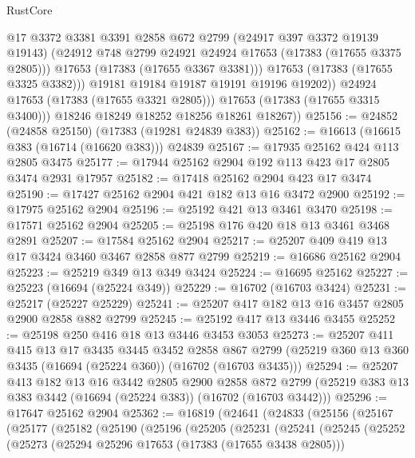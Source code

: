 \begin{lexlean}{RustCore}
\begin{coremodule}
                    @17
                    @3372
                    @3381
                    @3391
                    @2858
                    @672
                    @2799
                    (@24917 @397 @3372 @19139 @19143)
                    (@24912 @748 @2799 @24921 @24924 @17653 (@17383 (@17655 @3375 @2805)))
                    @17653
                    (@17383 (@17655 @3367 @3381)))
                  @17653
                  (@17383 (@17655 @3325 @3382)))
                @19181
                @19184
                @19187
                @19191
                @19196
                @19202))
            @24924
            @17653
            (@17383 (@17655 @3321 @2805)))
          @17653
          (@17383 (@17655 @3315 @3400)))
        @18246
        @18249
        @18252
        @18256
        @18261
        @18267))
@25156 := @24852 (@24858 @25150) (@17383 (@19281 @24839 @383))
@25162 := @16613 (@16615 @383 (@16714 (@16620 @383))) @24839
@25167 := @17935 @25162 @424 @113 @2805 @3475
@25177 := @17944 @25162 @2904 @192 @113 @423 @17 @2805 @3474 @2931 @17957
@25182 := @17418 @25162 @2904 @423 @17 @3474
@25190 := @17427 @25162 @2904 @421 @182 @13 @16 @3472 @2900
@25192 := @17975 @25162 @2904
@25196 := @25192 @421 @13 @3461 @3470
@25198 := @17571 @25162 @2904
@25205 := @25198 @176 @420 @18 @13 @3461 @3468 @2891
@25207 := @17584 @25162 @2904
@25217 := @25207 @409 @419 @13 @17 @3424 @3460 @3467 @2858 @877 @2799
@25219 := @16686 @25162 @2904
@25223 := @25219 @349 @13 @349 @3424
@25224 := @16695 @25162
@25227 := @25223 (@16694 (@25224 @349))
@25229 := @16702 (@16703 @3424)
@25231 := @25217 (@25227 @25229)
@25241 := @25207 @417 @182 @13 @16 @3457 @2805 @2900 @2858 @882 @2799
@25245 := @25192 @417 @13 @3446 @3455
@25252 := @25198 @250 @416 @18 @13 @3446 @3453 @3053
@25273 := @25207
    @411
    @415
    @13
    @17
    @3435
    @3445
    @3452
    @2858
    @867
    @2799
    (@25219 @360 @13 @360 @3435 (@16694 (@25224 @360)) (@16702 (@16703 @3435)))
@25294 := @25207
    @413
    @182
    @13
    @16
    @3442
    @2805
    @2900
    @2858
    @872
    @2799
    (@25219 @383 @13 @383 @3442 (@16694 (@25224 @383)) (@16702 (@16703 @3442)))
@25296 := @17647 @25162 @2904
@25362 := @16819
    (@24641
      (@24833
        (@25156
          (@25167
            (@25177
              (@25182
                (@25190
                  (@25196
                    (@25205
                      (@25231
                        (@25241
                          (@25245
                            (@25252
                              (@25273
                                (@25294 @25296 @17653 (@17383 (@17655 @3438 @2805)))

\end{coremodule}
\end{lexlean}

